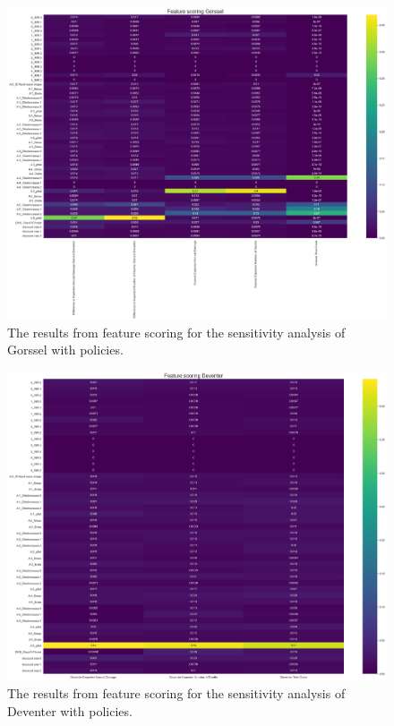 \begin{figure}[h!]
    \centering
    \includegraphics[width=\textwidth]{report/figures/results/Feature_scoring_Gorssel_100scen.png}
    \caption{The results from feature scoring for the sensitivity analysis of Gorssel with policies.}
    \label{fig:feat-scor-g}
\end{figure}

\begin{figure}[h!]
    \centering
    \includegraphics[width=\textwidth]{report/figures/results/Feature_scoring_Deventer_100scen.png}
    \caption{The results from feature scoring for the sensitivity analysis of Deventer with policies.}
    \label{fig:feat-scor-d}
\end{figure}

